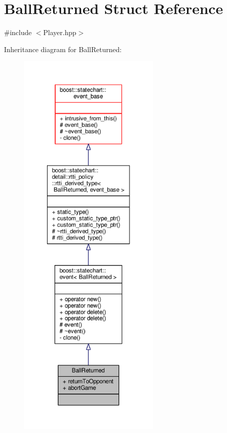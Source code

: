 \hypertarget{struct_ball_returned}{}\section{Ball\+Returned Struct Reference}
\label{struct_ball_returned}


{\ttfamily \#include $<$Player.\+hpp$>$}



Inheritance diagram for Ball\+Returned\+:
\nopagebreak
\begin{figure}[H]
\begin{center}
\leavevmode
\includegraphics[height=550pt]{struct_ball_returned__inherit__graph}
\end{center}
\end{figure}


